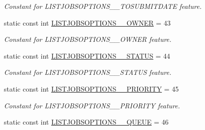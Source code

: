 \begin{DoxyCompactItemize}
\begin{DoxyCompactList}\small\item\em Constant for LISTJOBSOPTIONS\_\-\_\-TOSUBMITDATE feature. \item\end{DoxyCompactList}\item 
\hypertarget{classTMS__Data_1_1TMS__DataPackage_ae8946915fbaaca4f02ff2faea8100e1f}{
static const int \hyperlink{classTMS__Data_1_1TMS__DataPackage_ae8946915fbaaca4f02ff2faea8100e1f}{LISTJOBSOPTIONS\_\-\_\-OWNER} = 43}
\label{classTMS__Data_1_1TMS__DataPackage_ae8946915fbaaca4f02ff2faea8100e1f}

\begin{DoxyCompactList}\small\item\em Constant for LISTJOBSOPTIONS\_\-\_\-OWNER feature. \item\end{DoxyCompactList}\item 
\hypertarget{classTMS__Data_1_1TMS__DataPackage_a9a4d2104912c340ac8a3e26a92cf5265}{
static const int \hyperlink{classTMS__Data_1_1TMS__DataPackage_a9a4d2104912c340ac8a3e26a92cf5265}{LISTJOBSOPTIONS\_\-\_\-STATUS} = 44}
\label{classTMS__Data_1_1TMS__DataPackage_a9a4d2104912c340ac8a3e26a92cf5265}

\begin{DoxyCompactList}\small\item\em Constant for LISTJOBSOPTIONS\_\-\_\-STATUS feature. \item\end{DoxyCompactList}\item 
\hypertarget{classTMS__Data_1_1TMS__DataPackage_a650c8a49deeb1b2ece1f9d13e78012b8}{
static const int \hyperlink{classTMS__Data_1_1TMS__DataPackage_a650c8a49deeb1b2ece1f9d13e78012b8}{LISTJOBSOPTIONS\_\-\_\-PRIORITY} = 45}
\label{classTMS__Data_1_1TMS__DataPackage_a650c8a49deeb1b2ece1f9d13e78012b8}

\begin{DoxyCompactList}\small\item\em Constant for LISTJOBSOPTIONS\_\-\_\-PRIORITY feature. \item\end{DoxyCompactList}\item 
\hypertarget{classTMS__Data_1_1TMS__DataPackage_aeebfa0a14dbf1bf219a8a2cfb5a6fe52}{
static const int \hyperlink{classTMS__Data_1_1TMS__DataPackage_aeebfa0a14dbf1bf219a8a2cfb5a6fe52}{LISTJOBSOPTIONS\_\-\_\-QUEUE} = 46}
\label{classTMS__Data_1_1TMS__DataPackage_aeebfa0a14dbf1bf219a8a2cfb5a6fe52}


\end{DoxyCompactItemize}
